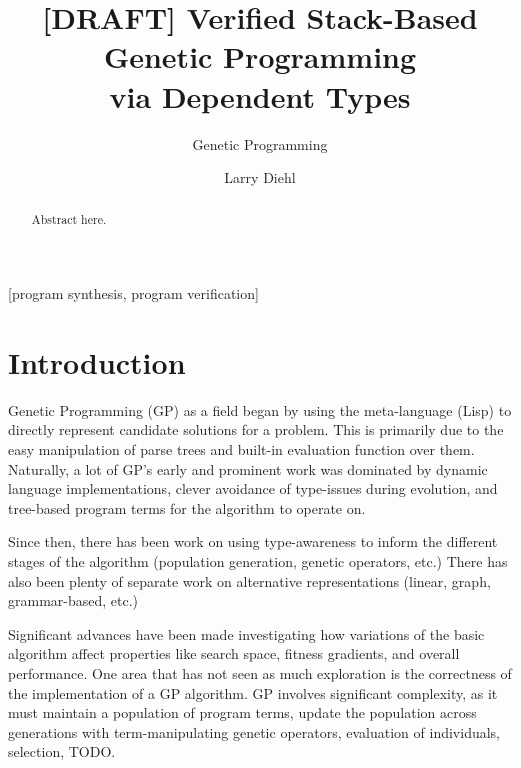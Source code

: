 \documentclass{acm_proc_article-sp}
\begin{document}
\title{[DRAFT] Verified Stack-Based Genetic Programming\\
via Dependent Types}

\subtitle{Genetic Programming}

\author{
\alignauthor Larry Diehl\\
}

\maketitle
\begin{abstract}
Abstract here.
\end{abstract}

[program synthesis, program verification]



\section{Introduction}

Genetic Programming (GP) as a field began by using the meta-language
(Lisp) to directly represent candidate solutions for a problem. This is primarily due
to the easy manipulation of parse trees and built-in evaluation
function over them. Naturally, a lot of GP's early and prominent work
was dominated by dynamic language implementations, clever avoidance of
\cite{to:do} type-issues during evolution, and tree-based program terms
for the algorithm to operate on.

Since then, there has been work on using type-awareness to inform the
different stages of the algorithm \cite{to:do} (population generation,
genetic operators, etc.) There has also been plenty of separate work
on alternative representations (linear, graph, grammar-based, etc.)

Significant advances have been made investigating how variations of
the basic algorithm affect properties like search space, fitness
gradients, and overall performance. One area that has not seen as much
exploration is the correctness of the implementation of a GP
algorithm. GP involves significant complexity, as it must maintain a
population of program terms, update the population across generations
with term-manipulating genetic operators, evaluation of individuals,
selection, TODO.
\end{document}
